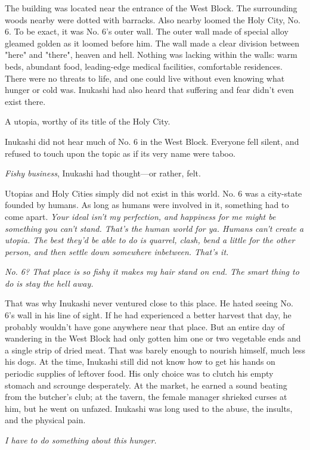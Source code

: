 The building was located near the entrance of the West Block. The
surrounding woods nearby were dotted with barracks. Also nearby loomed
the Holy City, No. 6. To be exact, it was No. 6's outer wall. The outer
wall made of special alloy gleamed golden as it loomed before him. The
wall made a clear division between "here" and "there", heaven and hell.
Nothing was lacking within the walls: warm beds, abundant food,
leading-edge medical facilities, comfortable residences. There were no
threats to life, and one could live without even knowing what hunger or
cold was. Inukashi had also heard that suffering and fear didn't even
exist there.

A utopia, worthy of its title of the Holy City.

Inukashi did not hear much of No. 6 in the West Block. Everyone fell
silent, and refused to touch upon the topic as if its very name were
taboo.

\emph{Fishy business}, Inukashi had thought---or rather, felt.

Utopias and Holy Cities simply did not exist in this world. No. 6 was a
city-state founded by humans. As long as humans were involved in it,
something had to come apart. \emph{Your ideal isn't my perfection, and
happiness for me might be something you can't stand. That's the human
world for ya. Humans can't create a utopia. The best they'd be able to
do is quarrel, clash, bend a little for the other person, and then
settle down somewhere inbetween. That's it.}

\emph{No. 6? That place is so fishy it makes my hair stand on end. The smart
thing to do is stay the hell away.}

That was why Inukashi never ventured close to this place. He hated
seeing No. 6's wall in his line of sight. If he had experienced a better
harvest that day, he probably wouldn't have gone anywhere near that
place. But an entire day of wandering in the West Block had only gotten
him one or two vegetable ends and a single strip of dried meat. That was
barely enough to nourish himself, much less his dogs. At the time,
Inukashi still did not know how to get his hands on periodic supplies of
leftover food. His only choice was to clutch his empty stomach and
scrounge desperately. At the market, he earned a sound beating from the
butcher's club; at the tavern, the female manager shrieked curses at
him, but he went on unfazed. Inukashi was long used to the abuse, the
insults, and the physical pain.

\emph{I have to do something about this hunger.}


